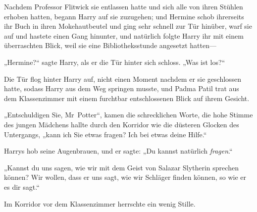 Nachdem Professor Flitwick sie entlassen hatte und sich alle von ihren Stühlen erhoben hatten, begann Harry auf sie zuzugehen; und Hermine schob ihrerseits ihr Buch in ihren Mokehautbeutel und ging sehr schnell zur Tür hinüber, warf sie auf und hastete einen Gang hinunter, und natürlich folgte Harry ihr mit einem überraschten Blick, weil sie eine Bibliotheksstunde angesetzt hatten—

„Hermine?“ sagte Harry, als er die Tür hinter sich schloss. „Was ist los?“

Die Tür flog hinter Harry auf, nicht einen Moment nachdem er sie geschlossen hatte, sodass Harry aus dem Weg springen musste, und Padma Patil trat aus dem Klassenzimmer mit einem furchtbar entschlossenen Blick auf ihrem Gesicht.

„Entschuldigen Sie, Mr~Potter“, kamen die schrecklichen Worte, die hohe Stimme des jungen Mädchens hallte durch den Korridor wie die düsteren Glocken des Untergangs, „kann ich Sie etwas fragen? Ich bei etwas deine Hilfe.“

Harrys hob seine Augenbrauen, und er sagte: „Du kannst natürlich \emph{fragen}.“

„Kannst du uns sagen, wie wir mit dem Geist von Salazar Slytherin sprechen können? Wir wollen, dass er uns sagt, wie wir Schläger finden können, so wie er es dir sagt.“

Im Korridor vor dem Klassenzimmer herrschte ein wenig Stille.

